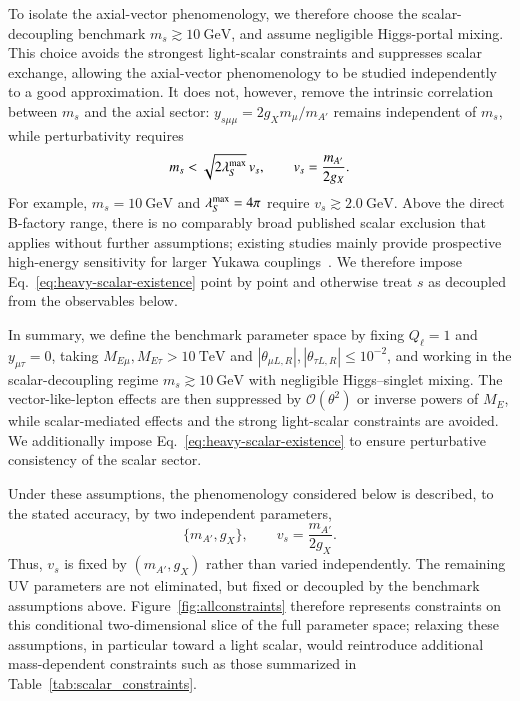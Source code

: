 \documentclass[onecolumn, aps, nofootinbib, prd, preprint, floats, floatfix, amsmath, amssymb, superscriptaddress, preprintnumbers]{revtex4-2}
\begin{document}
To isolate the axial-vector phenomenology, we therefore choose the scalar-decoupling benchmark $m_s\gtrsim10~\mathrm{GeV}$, 
and assume negligible Higgs-portal mixing. This choice avoids the strongest light-scalar constraints and suppresses scalar exchange, allowing the axial-vector phenomenology to be studied independently to a good approximation. It does not, however, remove the intrinsic correlation between $m_s$ and the axial sector: $y_{s\mu\mu}=2g_Xm_\mu/m_{A'}$ remains independent of $m_s$, while perturbativity requires
\begin{equation}
m_s<\sqrt{2\lambda_S^{\rm max}}\,v_s,
\qquad v_s=\frac{m_{A'}}{2g_X}.
\label{eq:heavy-scalar-existence}
\end{equation}
For example, $m_s=10~\mathrm{GeV}$ and $\lambda_S^{\rm max}=4\pi$ require $v_s\gtrsim2.0~\mathrm{GeV}$. Above the direct B-factory range, there is no comparably broad published scalar exclusion that applies without further assumptions; existing studies mainly provide prospective high-energy sensitivity for larger Yukawa couplings~\cite{Chen:2021leptophilic}. We therefore impose Eq.~\eqref{eq:heavy-scalar-existence} point by point and otherwise treat $s$ as decoupled from the observables below.

In summary, we define the benchmark parameter space by fixing $Q_\ell=1$ and $y_{\mu\tau}=0$, taking
$M_{E\mu},M_{E\tau}>10~\mathrm{TeV}$ and
$|\theta_{\mu L,R}|,|\theta_{\tau L,R}|\leq10^{-2}$, and working in the scalar-decoupling regime $m_s\gtrsim10~\mathrm{GeV}$ with negligible Higgs--singlet mixing. The vector-like-lepton effects are then suppressed by $\mathcal{O}(\theta^2)$ or inverse powers of $M_E$, while scalar-mediated effects and the strong light-scalar constraints are avoided. We additionally impose Eq.~\eqref{eq:heavy-scalar-existence} to ensure perturbative consistency of the scalar sector.

Under these assumptions, the phenomenology considered below is described, to the stated accuracy, by two independent parameters,
\begin{equation}
\{m_{A'},g_X\},
\qquad
v_s=\frac{m_{A'}}{2g_X}.
\label{eq}
\end{equation}
Thus, $v_s$ is fixed by $(m_{A'},g_X)$ rather than varied independently. The remaining UV parameters are not eliminated, but fixed or decoupled by the benchmark assumptions above. Figure~\ref{fig:allconstraints} therefore represents constraints on this conditional two-dimensional slice of the full parameter space; relaxing these assumptions, in particular toward a light scalar, would reintroduce additional mass-dependent constraints such as those summarized in Table~\ref{tab:scalar_constraints}.
\end{document}
